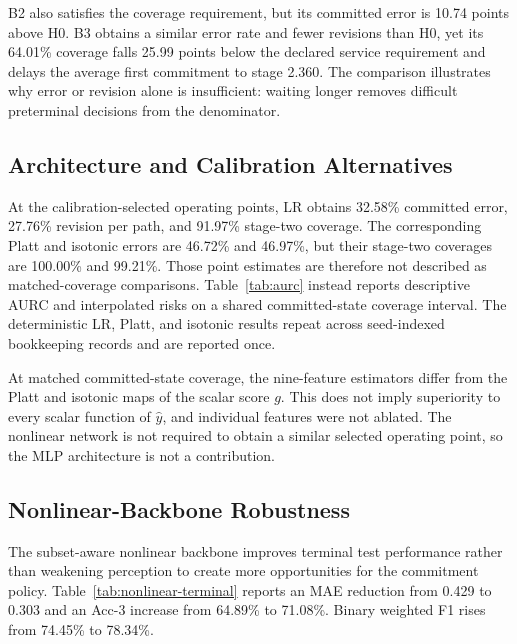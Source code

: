 \documentclass[journal]{IEEEtran}
\begin{document}




B2 also satisfies the coverage requirement, but its committed error is 10.74 points above H0. B3 obtains a similar error rate and fewer revisions than H0, yet its 64.01\% coverage falls 25.99 points below the declared service requirement and delays the average first commitment to stage 2.360. The comparison illustrates why error or revision alone is insufficient: waiting longer removes difficult preterminal decisions from the denominator.

\subsection{Architecture and Calibration Alternatives}

At the calibration-selected operating points, LR obtains 32.58\% committed error, 27.76\% revision per path, and 91.97\% stage-two coverage. The corresponding Platt and isotonic errors are 46.72\% and 46.97\%, but their stage-two coverages are 100.00\% and 99.21\%. Those point estimates are therefore not described as matched-coverage comparisons. Table~\ref{tab:aurc} instead reports descriptive AURC and interpolated risks on a shared committed-state coverage interval. The deterministic LR, Platt, and isotonic results repeat across seed-indexed bookkeeping records and are reported once.



At matched committed-state coverage, the nine-feature estimators differ from the Platt and isotonic maps of the scalar score $g$. This does not imply superiority to every scalar function of $\hat y$, and individual features were not ablated. The nonlinear network is not required to obtain a similar selected operating point, so the MLP architecture is not a contribution.

\subsection{Nonlinear-Backbone Robustness}

The subset-aware nonlinear backbone improves terminal test performance rather than weakening perception to create more opportunities for the commitment policy. Table~\ref{tab:nonlinear-terminal} reports an MAE reduction from 0.429 to 0.303 and an Acc-3 increase from 64.89\% to 71.08\%. Binary weighted F1 rises from 74.45\% to 78.34\%.
\end{document}
